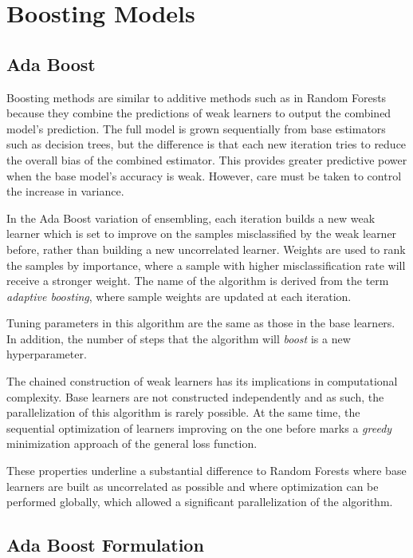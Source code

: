 \section{Boosting Models}\label{section-boosting}
\subsection{Ada Boost}
\textcite{schapire-adaBoost}

Boosting methods are similar to additive methods such as in Random Forests because they combine the predictions of weak learners to output the combined model's prediction. The full model is grown sequentially from base estimators such as decision trees, but the difference is that each new iteration tries to reduce the overall bias of the combined estimator. This provides greater predictive power when the base model's accuracy is weak. However, care must be taken to control the increase in variance.

In the Ada Boost variation of ensembling, each iteration builds a new weak learner which is set to improve on the samples misclassified by the weak learner before, rather than building a new uncorrelated learner. Weights are used to rank the samples by importance, where a sample with higher misclassification rate will receive a stronger weight. The name of the algorithm is derived from the term \textit{adaptive boosting}, where sample weights are updated at each iteration.

Tuning parameters in this algorithm are the same as those in the base learners. In addition, the number of steps that the algorithm will \textit{boost} is a new hyperparameter.

The chained construction of weak learners has its implications in computational complexity. Base learners are not constructed independently and as such, the parallelization of this algorithm is rarely possible. At the same time, the sequential optimization of learners improving on the one before marks a \textit{greedy} minimization approach of the general loss function.

These properties underline a substantial difference to Random Forests where base learners are built as uncorrelated as possible and where optimization can be performed globally, which allowed a significant parallelization of the algorithm.

\subsection{Ada Boost Formulation}

